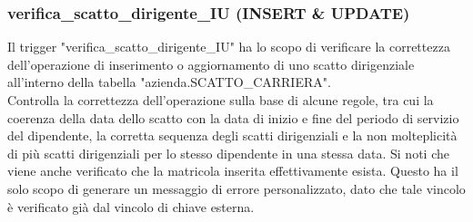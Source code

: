         \subsubsection{verifica\_scatto\_dirigente\_IU (INSERT \& UPDATE)}
        Il trigger "verifica\_scatto\_dirigente\_IU" ha lo scopo di verificare la correttezza dell'operazione di inserimento o aggiornamento di uno scatto dirigenziale all'interno della tabella "azienda.SCATTO\_CARRIERA".\\
        Controlla la correttezza dell'operazione sulla base di alcune regole, tra cui la coerenza della data dello scatto con la data di inizio e fine del periodo di servizio del dipendente, la corretta sequenza degli scatti dirigenziali e la non molteplicità di più scatti dirigenziali per lo stesso dipendente in una stessa data. Si noti che viene anche verificato che la matricola inserita effettivamente esista. Questo ha il solo scopo di generare un messaggio di errore personalizzato, dato che tale vincolo è verificato già dal vincolo di chiave esterna.
        \ttfamily
